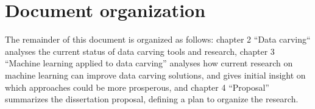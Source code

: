 \section{Document organization}
The remainder of this document is organized as follows:
    chapter 2 ``Data carving`` analyses the current status of data carving tools and research, 
    chapter 3 ``Machine learning applied to data carving'' analyses how current research on machine learning can improve data carving solutions, and gives initial insight on which approaches could be more prosperous,
    and
    chapter 4 ``Proposal'' summarizes the dissertation proposal, defining a plan to organize the research.

